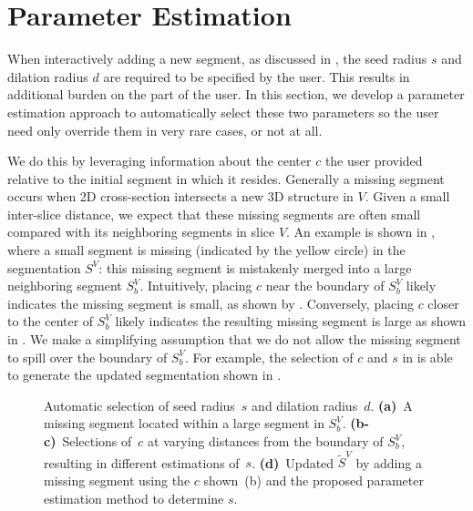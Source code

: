 \documentclass[]{spie}  %
\begin{document}
\section{Parameter Estimation}
\label{sec:param}

When interactively adding a new segment, as discussed in
, the seed radius $s$ and dilation radius $d$ are
required to be specified by the user.  This results in additional
burden on the part of the user.  In this section, we develop a
parameter estimation approach to automatically select these two
parameters so the user need only override them in very rare cases, or
not at all.

We do this by leveraging information about the center $c$ the user
provided relative to the initial segment in which it resides.
Generally a missing segment occurs when 2D cross-section intersects a
new 3D structure in $V$.  Given a small inter-slice distance, we
expect that these missing segments are often small compared with its
neighboring segments in slice $V$.  An example is shown in
, where a small segment is missing (indicated by the
yellow circle) in the segmentation $S^V$: this missing segment is
mistakenly merged into a large neighboring segment $S^V_b$.
Intuitively, placing $c$ near the boundary of $S^V_b$ likely indicates
the missing segment is small, as shown by .
Conversely, placing $c$ closer to the center of $S^V_b$ likely
indicates the resulting missing segment is large as shown in
.  We make a simplifying assumption that we do not
allow the missing segment to spill over the boundary of $S^V_b$.  For
example, the selection of $c$ and $s$ in  is able to
generate the updated segmentation shown in .
\begin{figure}[htb]
\centering
{}
\hspace{0.1em}

\hspace{0.1em}
\caption{Automatic selection of seed radius~$s$ and dilation
  radius~$d$.  \textbf{(a)}~A missing segment located within a large
  segment in $S^V_b$.  \textbf{(b-c)}~Selections of~$c$ at varying
  distances from the boundary of $S^V_b$, resulting in different
  estimations of~$s$.  \textbf{(d)}~Updated $\tilde{S}^V$ by adding
  a missing segment using the $c$ shown~(b) and the proposed parameter
  estimation method to determine $s$.} \label{fig:param}
\end{figure}
\end{document}
